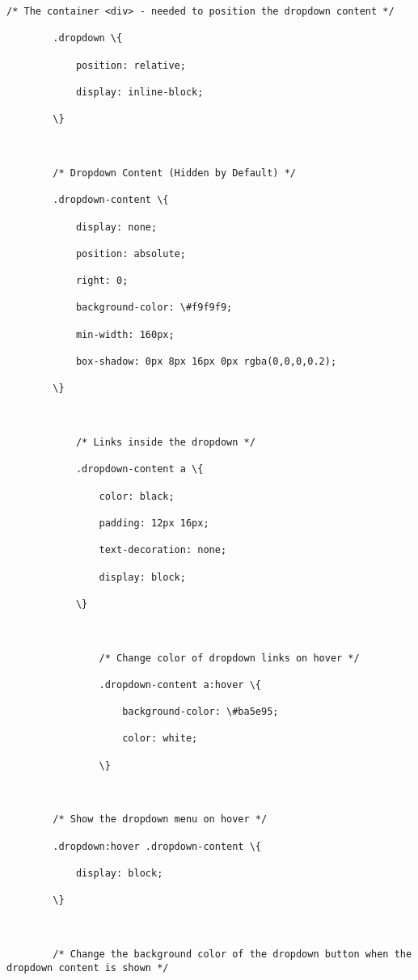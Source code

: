 \documentclass[11pt]{article}
\begin{document}
\begin{Verbatim}[commandchars=\\\{\}]
        /* The container <div> - needed to position the dropdown content */

        .dropdown \{

            position: relative;

            display: inline-block;

        \}



        /* Dropdown Content (Hidden by Default) */

        .dropdown-content \{

            display: none;

            position: absolute;

            right: 0;

            background-color: \#f9f9f9;

            min-width: 160px;

            box-shadow: 0px 8px 16px 0px rgba(0,0,0,0.2);

        \}



            /* Links inside the dropdown */

            .dropdown-content a \{

                color: black;

                padding: 12px 16px;

                text-decoration: none;

                display: block;

            \}



                /* Change color of dropdown links on hover */

                .dropdown-content a:hover \{

                    background-color: \#ba5e95;

                    color: white;

                \}



        /* Show the dropdown menu on hover */

        .dropdown:hover .dropdown-content \{

            display: block;

        \}



        /* Change the background color of the dropdown button when the dropdown content is shown */


\end{Verbatim}
\end{document}
